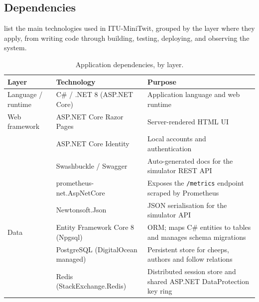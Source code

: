 \subsection{Dependencies}
\label{sec:dependencies}

\noindent {} list the main technologies used in ITU-MiniTwit, grouped by the layer
where they apply, from writing code through building, testing, deploying, and observing the system.

\begin{table}[H]
    \centering
    \caption{Application dependencies, by layer.}
    \label{tab:dependencies-app}
    \small
    \begin{tabularx}{\linewidth}{l l X}
        \toprule
        \textbf{Layer} & \textbf{Technology} & \textbf{Purpose} \\
        \midrule
        Language / runtime & C\# / .NET 8 (ASP.NET Core) & Application language and web runtime \\
        \midrule
        Web framework & ASP.NET Core Razor Pages & Server-rendered HTML UI \\
            & ASP.NET Core Identity & Local accounts and authentication \\
            & Swashbuckle / Swagger & Auto-generated docs for the simulator REST API \\
            & prometheus-net.AspNetCore & Exposes the \texttt{/metrics} endpoint scraped by Prometheus \\
            & Newtonsoft.Json & JSON serialisation for the simulator API \\
        \midrule
        Data & Entity Framework Core 8 (Npgsql) & ORM; maps C\# entities to tables and manages schema migrations \\
            & PostgreSQL (DigitalOcean managed) & Persistent store for cheeps, authors and follow relations \\
            & Redis (StackExchange.Redis) & Distributed session store and shared ASP.NET DataProtection key ring \\
        \bottomrule
    \end{tabularx}
\end{table}

